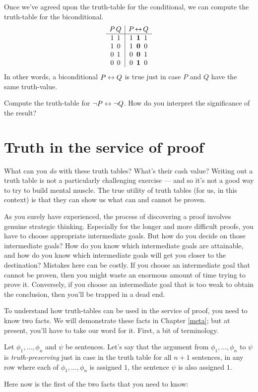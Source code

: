 Once we've agreed upon the truth-table for the conditional, we can
compute the truth-table for the biconditional.
\[ \begin{array}{c@{\, }c | c@{\, }c@{\, }c@{ }c c}
P & Q &   P & \leftrightarrow & Q & \\
\hline 
1 & 1 &   1 & \mathbf{1} & 1 & \\
1 & 0 &   1 & \mathbf{0} & 0 & \\
0 & 1 &   0 & \mathbf{0} & 1 & \\
0 & 0 &   0 & \mathbf{1} & 0 & \end{array} \]
In other words, a biconditional $P\leftrightarrow Q$ is true just in case $P$ and
$Q$ have the same truth-value.

\begin{exercise} Compute the truth-table for $\neg P\leftrightarrow \neg Q$.  How
  do you interpret the significance of the result? \end{exercise}

\section{Truth in the service of proof}

What can you {\it do} with these truth tables?  What's their cash
value?  Writing out a truth table is not a particularly challenging
exercise --- and so it's not a good way to try to build mental muscle.
The true utility of truth tables (for us, in this context) is that
they can show us what can and cannot be proven.

As you surely have experienced, the process of discovering a proof
involves genuine strategic thinking.  Especially for the longer and
more difficult proofs, you have to choose appropriate intermediate
goals.  But how do you decide on those intermediate goals?  How do you
know which intermediate goals are attainable, and how do you know
which intermediate goals will get you closer to the destination?
Mistakes here can be costly.  If you choose an intermediate goal that
cannot be proven, then you might waste an enormous amount of time
trying to prove it.  Conversely, if you choose an intermediate goal
that is too weak to obtain the conclusion, then you'll be trapped in a
dead end.

To understand how truth-tables can be used in the service of proof,
you need to know two facts.  We will demonstrate these facts in
Chapter \ref{meta}; but at present, you'll have to take our word for
it.  First, a bit of terminology.
\begin{defn} Let $\phi _1,\dots ,\phi _n$ and $\psi$ be sentences.
  Let's say that the argument from $\phi _1,\dots ,\phi _n$ to $\psi$
  is \emph{truth-preserving} just in case in the truth table for all
  $n+1$ sentences, in any row where each of $\phi _1,\dots ,\phi _n$
  is assigned $1$, the sentence $\psi$ is also assigned
  $1$. \end{defn}
Here now is the first of the two facts that you need to know:

